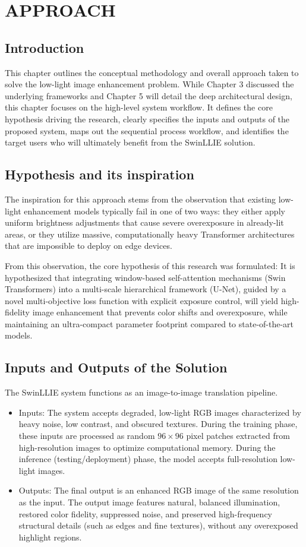 \documentclass[12pt, a4paper]{report}
\begin{document}
\chapter{APPROACH}
\section{Introduction}
This chapter outlines the conceptual methodology and overall approach taken to solve the low-light image enhancement problem. While Chapter 3 discussed the underlying frameworks and Chapter 5 will detail the deep architectural design, this chapter focuses on the high-level system workflow. It defines the core hypothesis driving the research, clearly specifies the inputs and outputs of the proposed system, maps out the sequential process workflow, and identifies the target users who will ultimately benefit from the SwinLLIE solution.

\section{Hypothesis and its inspiration}
The inspiration for this approach stems from the observation that existing low-light enhancement models typically fail in one of two ways: they either apply uniform brightness adjustments that cause severe overexposure in already-lit areas, or they utilize massive, computationally heavy Transformer architectures that are impossible to deploy on edge devices.

From this observation, the core hypothesis of this research was formulated: It is hypothesized that integrating window-based self-attention mechanisms (Swin Transformers) into a multi-scale hierarchical framework (U-Net), guided by a novel multi-objective loss function with explicit exposure control, will yield high-fidelity image enhancement that prevents color shifts and overexposure, while maintaining an ultra-compact parameter footprint compared to state-of-the-art models.

\section{Inputs and Outputs of the Solution}
The SwinLLIE system functions as an image-to-image translation pipeline.
\begin{itemize}
    \item Inputs: The system accepts degraded, low-light RGB images characterized by heavy noise, low contrast, and obscured textures. During the training phase, these inputs are processed as random $96 \times 96$ pixel patches extracted from high-resolution images to optimize computational memory. During the inference (testing/deployment) phase, the model accepts full-resolution low-light images.
    \item Outputs: The final output is an enhanced RGB image of the same resolution as the input. The output image features natural, balanced illumination, restored color fidelity, suppressed noise, and preserved high-frequency structural details (such as edges and fine textures), without any overexposed highlight regions.
\end{itemize}
\end{document}
